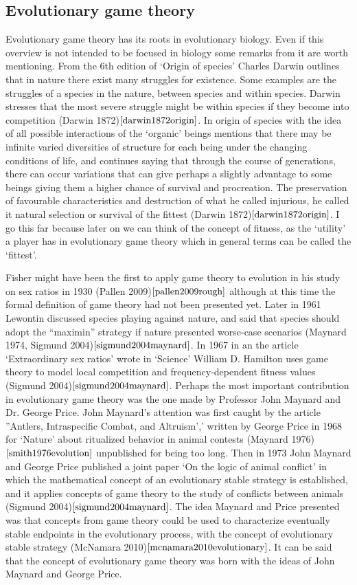 \documentclass{article}
\begin{document}
\subsection{Evolutionary game theory}
Evolutionary game theory has its roots in evolutionary biology. Even if this overview is not intended to be focused in biology some remarks from it are worth mentioning. From the 6th edition of ‘Origin of species’ Charles Darwin outlines that in nature there exist many struggles for existence. Some examples are the struggles of a species in the nature, between species and within species. Darwin stresses that the most severe struggle might be within species if they become into competition (Darwin 1872)$\cite{darwin1872origin}$. In origin of species with the idea of all possible interactions of the `organic’ beings mentions that there may be infinite varied diversities of structure for each being under the changing conditions of life, and continues saying that through the course of generations, there can occur variations that can give perhaps a slightly advantage to some beings giving them a higher chance of survival and procreation. The preservation of favourable characteristics and destruction of what he called injurious, he called it natural selection or survival of the fittest (Darwin 1872)$\cite{darwin1872origin}$. I go this far because later on we can think of the concept of fitness, as the ‘utility’ a player has in evolutionary game theory which in general terms can be called the ‘fittest’.

Fisher might have been the first to apply game theory to evolution in his study on sex ratios in 1930 (Pallen 2009)$\cite{pallen2009rough}$ although at this time the formal definition of game theory had not been presented yet. Later in 1961 Lewontin discussed species playing against nature, and said that species should adopt the ``maximin'' strategy if nature presented worse-case scenarios (Maynard 1974, Sigmund 2004)$\cite{sigmund2004maynard}$. In 1967 in an the article ‘Extraordinary sex ratios’ wrote in ‘Science’ William D. Hamilton uses game theory to model local competition and frequency-dependent fitness values (Sigmund 2004)$\cite{sigmund2004maynard}$. Perhaps the most important contribution in evolutionary game theory was the one made by Professor John Maynard and Dr. George Price. John Maynard’s attention was first caught by the article ''Antlers, Intraspecific Combat, and Altruism',' written by George Price in 1968 for `Nature’ about ritualized behavior in animal contests (Maynard 1976)$\cite{smith1976evolution}$ unpublished for being too long. Then in 1973 John Maynard and George Price published a joint paper ‘On the logic of animal conflict’ in which the mathematical concept of an evolutionary stable strategy is established, and it applies concepts of game theory to the study of conflicts between animals (Sigmund 2004)$\cite{sigmund2004maynard}$.  The idea Maynard and Price presented was that concepts from game theory could be used to characterize eventually stable endpoints in the evolutionary process, with the concept of evolutionary stable strategy (McNamara 2010)$\cite{mcnamara2010evolutionary}$. It can be said that the concept of evolutionary game theory was born with the ideas of John Maynard and George Price.
\end{document}
